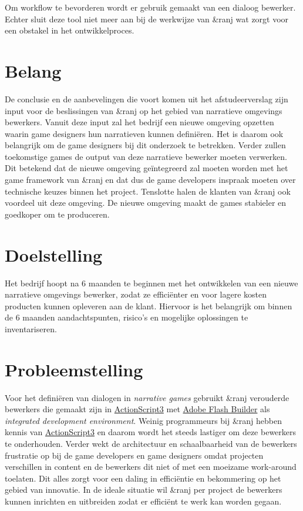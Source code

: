 \documentclass{report}
\newcommand{\organisation}{\&ranj }
\begin{document}
Om workflow te bevorderen wordt er gebruik gemaakt van een dialoog bewerker\cite{interviewivo}. Echter sluit deze tool niet meer aan bij de werkwijze van \organisation \cite{interviewivo} wat zorgt voor een obstakel in het ontwikkelproces.

\section{Belang}
De conclusie en de aanbevelingen die voort komen uit het afstudeerverslag zijn input voor de beslissingen van \organisation op het gebied van narratieve omgevings bewerkers. Vanuit deze input zal het bedrijf een nieuwe omgeving opzetten waarin game designers hun narratieven kunnen defini{\"e}ren. Het is daarom ook belangrijk om de game designers bij dit onderzoek te betrekken. Verder zullen toekomstige games de output van deze narratieve bewerker moeten verwerken. Dit betekend dat de nieuwe omgeving ge{\"i}ntegreerd zal moeten worden met het game framework van \organisation en dat dus de game developers inspraak moeten over technische keuzes binnen het project. Tenslotte halen de klanten van \organisation ook voordeel uit deze omgeving. De nieuwe omgeving maakt de games stabieler en goedkoper om te produceren.

\section{Doelstelling}
Het bedrijf hoopt na 6 maanden te beginnen met het ontwikkelen van een nieuwe narratieve omgevings bewerker, zodat ze effici{\"e}nter en voor lagere kosten producten kunnen opleveren aan de klant. Hiervoor is het belangrijk om binnen de 6 maanden aandachtspunten, risico's en mogelijke oplossingen te inventariseren.

\section{Probleemstelling}
Voor het defini{\"e}ren van dialogen in \emph{narrative games} gebruikt \organisation verouderde bewerkers die gemaakt zijn in \href{http://www.adobe.com/devnet/actionscript/articles/actionscript3_overview.html}{ActionScript3} met \href{https://en.wikipedia.org/wiki/Adobe_Flash_Builder}{Adobe Flash Builder} als \emph{integrated development environment}. Weinig programmeurs bij \organisation hebben kennis van \href{http://www.adobe.com/devnet/actionscript/articles/actionscript3_overview.html}{ActionScript3} en daarom wordt het steeds lastiger om deze bewerkers te onderhouden. Verder wekt de architectuur en schaalbaarheid van de bewerkers frustratie op bij de game developers en game designers omdat projecten verschillen in content en de bewerkers dit niet of met een moeizame work-around toelaten. Dit alles zorgt voor een daling in effici{\"e}ntie en bekommering op het gebied van innovatie.
In de ideale situatie wil \organisation per project de bewerkers kunnen inrichten en uitbreiden zodat er effici{\"e}nt te werk kan worden gegaan.
\end{document}
